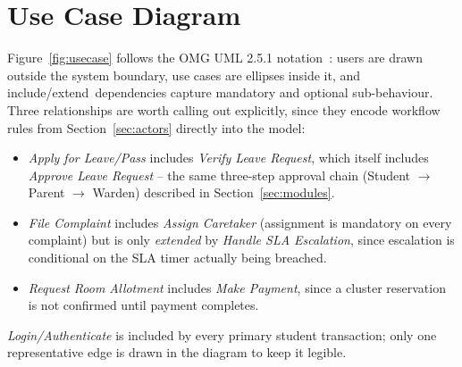 \documentclass{tietreport}
\begin{document}
\section{Use Case Diagram}

Figure~\ref{fig:usecase} follows the OMG UML 2.5.1
notation~\cite{umlspec}: users are drawn outside the system boundary,
use cases are ellipses inside it, and \guillemotleft
include\guillemotright/\guillemotleft extend\guillemotright\ dependencies
capture mandatory and optional sub-behaviour. Three relationships are
worth calling out explicitly, since they encode workflow rules from
Section~\ref{sec:actors} directly into the model:

\begin{itemize}
  \item \emph{Apply for Leave/Pass} includes \emph{Verify Leave Request},
    which itself includes \emph{Approve Leave Request} -- the same
    three-step approval chain (Student $\rightarrow$ Parent
    $\rightarrow$ Warden) described in Section~\ref{sec:modules}.
  \item \emph{File Complaint} includes \emph{Assign Caretaker} (assignment
    is mandatory on every complaint) but is only \emph{extended} by
    \emph{Handle SLA Escalation}, since escalation is conditional on the
    SLA timer actually being breached.
  \item \emph{Request Room Allotment} includes \emph{Make Payment}, since
    a cluster reservation is not confirmed until payment completes.
\end{itemize}

\emph{Login/Authenticate} is included by every primary student
transaction; only one representative edge is drawn in the diagram to keep
it legible.
\end{document}
